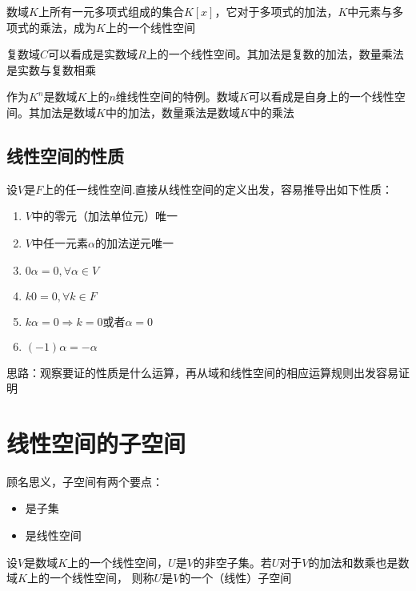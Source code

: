 \begin{example}
    数域$K$上所有一元多项式组成的集合$K[x]$，它对于多项式的加法，$K$中元素与多项式的乘法，成为$K$上的一个线性空间
\end{example}

\begin{example}
    复数域$C$可以看成是实数域$R$上的一个线性空间。其加法是复数的加法，数量乘法是实数与复数相乘
\end{example}

\begin{example}
    作为$K^n$是数域$K$上的$n$维线性空间的特例。数域$K$可以看成是自身上的一个线性空间。其加法是数域$K$中的加法，数量乘法是数域$K$中的乘法
\end{example}

\subsection{线性空间的性质}
设$V$是$F$上的任一线性空间.直接从线性空间的定义出发，容易推导出如下性质：
\begin{enumerate}
    \item $V$中的零元（加法单位元）唯一
    \item $V$中任一元素$\alpha$的加法逆元唯一
    \item $0\alpha = 0, \forall \alpha \in V$
    \item $k0=0, \forall k \in F$
    \item $k\alpha = 0 \Rightarrow k=0 \text{或者} \alpha = 0$
    \item $(-1)\alpha = -\alpha$
\end{enumerate}

\begin{remark}
    思路：观察要证的性质是什么运算，再从域和线性空间的相应运算规则出发容易证明
\end{remark}

\section{线性空间的子空间}
顾名思义，子空间有两个要点：
\begin{itemize}
    \item 是子集
    \item 是线性空间
\end{itemize}

\begin{definition}[子空间]
    设$V$是数域$K$上的一个线性空间，$U$是$V$的非空子集。若$U$对于$V$的加法和数乘也是数域$K$上的一个线性空间，
    则称$U$是$V$的一个（线性）子空间
\end{definition}


